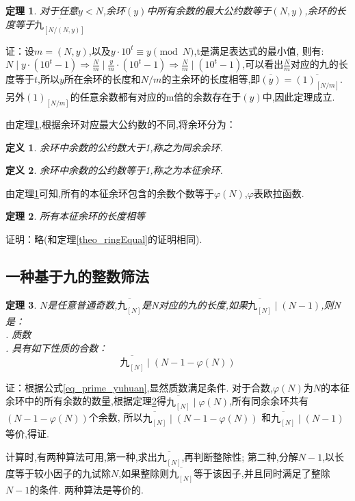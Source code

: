 \documentclass[a4paper]{article}
\renewcommand{\citep}[1]{\textsuperscript{\cite{#1}}}
\newtheorem{defination}{定义}[section]
\newtheorem{theorem}{定理}[section]
\numberwithin{equation}{section}
\begin{document}
\begin{theorem} \label{theo_N}对于任意$y<N$,余环$(y)$中所有余数的最大公约数等于$(N,y)$,余环的长度等于$\overline{九_{[N/(N,y)]}}$ \end{theorem}
	证：设$m=(N,y)$,以及$y\cdot 10^t \equiv y \pmod{N}$,t是满足表达式的最小值, 则有: $N \mid y \cdot (10^t-1) \Rightarrow  \frac{N}{m} \mid \frac{y}{m} \cdot (10^t-1) \Rightarrow  \frac{N}{m} \mid (10^t-1)$,可以看出$\frac{N}{m}$对应的九的长度等于$t$,所以$y$所在余环的长度和$N/m$的主余环的长度相等,即$\overline{(y)}=\overline{(1)_{[N/m]}}$.另外$(1)_{[N/m]}$的任意余数都有对应的m倍的余数存在于$(y)$中,因此定理成立.

	由定理\ref{theo_N},根据余环对应最大公约数的不同,将余环分为：	
\begin{defination}余环中余数的公约数大于1,称之为同余余环.\end{defination}
\begin{defination}余环中余数的公约数等于1,称之为本征余环.\end{defination}

	由定理\ref{theo_N}可知,所有的本征余环包含的余数个数等于$\varphi(N)$,$\varphi$表欧拉函数\citep{ref2}.

\begin{theorem} \label{theo_intrisic_ring}所有本征余环的长度相等\end{theorem}
	证明：略(和定理\ref{theo_ringEqual}的证明相同).
	

\subsection{一种基于九的整数筛法}
\begin{theorem}$N$是任意普通奇数,$\overline{九_{[N]}}$是N对应的九的长度,如果$\overline{九_{[N]}} \mid (N-1)$,则N是：\\
. 质数 \\
. 具有如下性质的合数：
\begin{displaymath} \overline{九_{[N]}} \mid (N-1-\varphi(N)) \end{displaymath}
\end{theorem}
证：根据公式\ref{eq_prime_yuhuan},显然质数满足条件.
对于合数,$\varphi(N)$为$N$的本征余环中的所有余数的数量,根据定理\ref{theo_intrisic_ring}得$\overline{九_{[N]}} \mid \varphi(N)$,所有同余余环共有$(N-1-\varphi(N))$个余数,
所以$\overline{九_{[N]}} \mid (N-1-\varphi(N))$ 和$\overline{九_{[N]}} \mid (N-1)$等价,得证.

计算时,有两种算法可用,第一种,求出$\overline{九_{[N]}}$,再判断整除性;
第二种,分解$N-1$,以长度等于较小因子的$九$试除$N$,如果整除则$\overline{九_{[N]}}$等于该因子,并且同时满足了整除$N-1$的条件.
两种算法是等价的.
\end{document}
